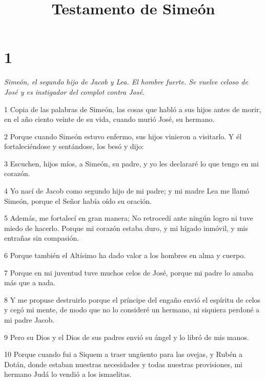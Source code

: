 

\title{Testamento de Simeón}

\chapter{1}

\par \textit{Simeón, el segundo hijo de Jacob y Lea. El hombre fuerte. Se vuelve celoso de José y es instigador del complot contra José.}

\par 1 Copia de las palabras de Simeón, las cosas que habló a sus hijos antes de morir, en el año ciento veinte de su vida, cuando murió José, su hermano.

\par 2 Porque cuando Simeón estuvo enfermo, sus hijos vinieron a visitarlo. Y él fortaleciéndose y sentándose, los besó y dijo:

\par 3 Escuchen, hijos míos, a Simeón, su padre, y yo les declararé lo que tengo en mi corazón.

\par 4 Yo nací de Jacob como segundo hijo de mi padre; y mi madre Lea me llamó Simeón, porque el Señor había oído su oración.

\par 5 Además, me fortalecí en gran manera; No retrocedí ante ningún logro ni tuve miedo de hacerlo. Porque mi corazón estaba duro, y mi hígado inmóvil, y mis entrañas sin compasión.

\par 6 Porque también el Altísimo ha dado valor a los hombres en alma y cuerpo.

\par 7 Porque en mi juventud tuve muchos celos de José, porque mi padre lo amaba más que a nada.

\par 8 Y me propuse destruirlo porque el príncipe del engaño envió el espíritu de celos y cegó mi mente, de modo que no lo consideré un hermano, ni siquiera perdoné a mi padre Jacob.

\par 9 Pero su Dios y el Dios de sus padres envió su ángel y lo libró de mis manos.

\par 10 Porque cuando fui a Siquem a traer ungüento para las ovejas, y Rubén a Dotán, donde estaban nuestras necesidades y todas nuestras provisiones, mi hermano Judá lo vendió a los ismaelitas.

